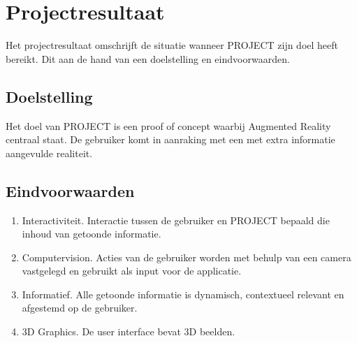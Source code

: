 \chapter{Projectresultaat} \label{cha:projectresultaat}
Het projectresultaat omschrijft de situatie wanneer PROJECT zijn doel heeft bereikt. Dit aan de hand van een doelstelling en eindvoorwaarden.
\section{Doelstelling} \label{sec:doelstelling}
Het doel van PROJECT is een proof of concept waarbij Augmented Reality centraal staat. De gebruiker komt in aanraking met een met extra informatie aangevulde realiteit.
\section{Eindvoorwaarden} \label{sec:eindvoorwaarden}
\begin{enumerate}
  \item Interactiviteit. Interactie tussen de gebruiker en PROJECT bepaald die inhoud van getoonde informatie.
  \item Computervision. Acties van de gebruiker worden met behulp van een camera vastgelegd en gebruikt als input voor de applicatie.
  \item Informatief. Alle getoonde informatie is dynamisch, contextueel relevant en afgestemd op de gebruiker.
  \item 3D Graphics. De user interface bevat 3D beelden. 
\end{enumerate}